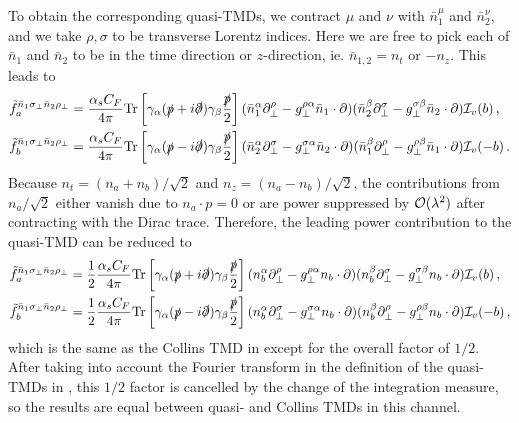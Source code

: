 \documentclass[11pt,a4paper]{article}
\newcommand{\nn}{\nonumber}
\newcommand{\bn}{{\bar{n}}}
\newcommand{\Tr}{\mathrm{Tr}}
\begin{document}
To obtain the corresponding quasi-TMDs, we contract $\mu$ and $\nu$ with $\bar{n}_1^\mu$ and $\bar{n}_2^\nu$, and we take $\rho, \sigma$ to be transverse Lorentz indices. Here we are free to pick each of $\bn_1$ and $\bn_2$ to be in the time direction or $z$-direction, ie. $\bn_{1,2}=n_t$ or $-n_z$. This leads to
\begin{align}
	\tilde f_a^{\bn_1\sigma_\perp\bn_2\rho_\perp}
	&=  {\alpha_sC_F\over 4\pi}  \Tr\left[\gamma_\alpha (\slashed{p}+i\slashed{\partial}) \gamma_\beta {\slashed p\over2} \right](\bn_1^{\alpha} \partial^\rho_\perp - g^{\rho\alpha}_\perp \bn_1\cdot\partial )(\bn_2^\beta\partial^\sigma_\perp  - g_\perp^{\sigma\beta} \bn_2\cdot \partial  ) {\cal I}_v(b)
	\,,\nn\\
	\tilde f_b^{\bn_1\sigma_\perp\bn_2\rho_\perp}
	&= {\alpha_sC_F\over 4\pi} \Tr\left[\gamma_\alpha (\slashed{p}-i\slashed{\partial}) \gamma_\beta {\slashed p\over2}  \right](\bn_2^\alpha \partial^\sigma_\perp -  g^{\sigma\alpha}_\perp \bn_2\cdot \partial )(\bn_1^{\beta}\partial^\rho_\perp -  g^{\rho\beta}_\perp \bn_1\cdot \partial) {\cal I}_v(-b)\,.
\end{align}
Because $n_t=(n_a+n_b)/\sqrt{2}$ and $n_z=(n_a-n_b)/\sqrt{2}$, the contributions from $n_a/\sqrt{2}$ either vanish due to $n_a\cdot p=0$ or are power suppressed by ${\cal O}(\lambda^2)$ after contracting with the Dirac trace. Therefore, the leading power contribution to the quasi-TMD can be reduced to
\begin{align}
	\tilde{f}_a^{\bn_1\sigma_\perp\bn_2\rho_\perp}
	&= {1\over2}{\alpha_sC_F\over 4\pi}  \Tr\left[\gamma_\alpha (\slashed{p}+i\slashed{\partial}) \gamma_\beta {\slashed p\over2} \right](n_b^{\alpha} \partial^\rho_\perp - g^{\rho\alpha}_\perp n_b\cdot\partial )(n_b^\beta\partial^\sigma_\perp  - g_\perp^{\sigma\beta}n_b\cdot \partial  ) {\cal I}_v(b)\,,\nn\\
	\tilde{f}_b^{\bn_1\sigma_\perp\bn_2\rho_\perp}
	&= {1\over2}{\alpha_sC_F\over 4\pi}\Tr\left[\gamma_\alpha (\slashed{p}-i\slashed{\partial}) \gamma_\beta {\slashed p\over2}  \right](n_b^\alpha \partial^\sigma_\perp -  g^{\sigma\alpha}_\perp n_b\cdot \partial )( n_b^{\beta}\partial^\rho_\perp -  g^{\rho\beta}_\perp n_b\cdot \partial) {\cal I}_v(-b)\,,
\end{align}
which is the same as the Collins TMD in  except for the overall factor of $1/2$. After taking into account the Fourier transform in the definition of the quasi-TMDs in , this $1/2$ factor is cancelled by the change of the integration measure, so the results are equal between quasi- and Collins TMDs in this channel.
\end{document}
